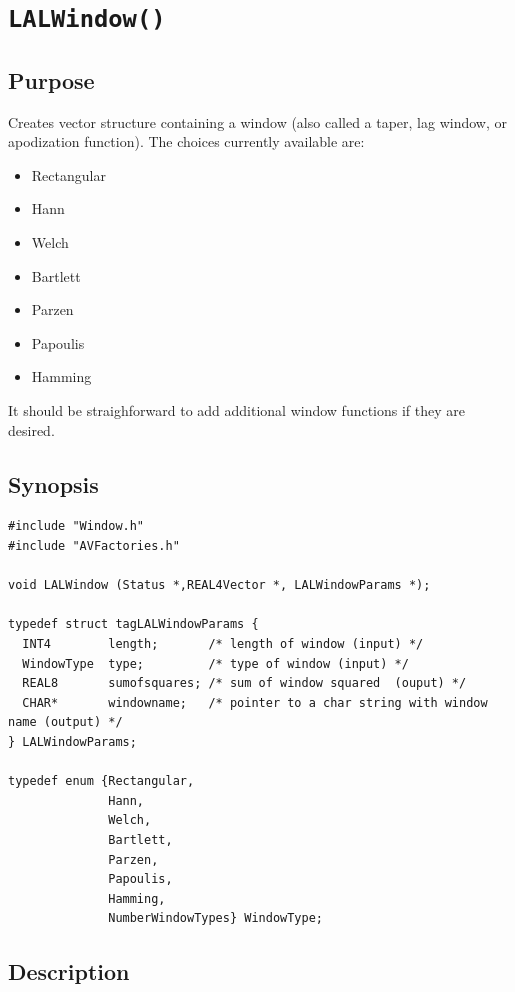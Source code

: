 \documentclass{article}
\begin{document}
\section{{\tt LALWindow()}}

\subsection{Purpose}

Creates vector structure containing a window (also called
a taper, lag window, or apodization function).  The choices
currently available are:
\begin{itemize}
\item Rectangular
\item Hann
\item Welch
\item Bartlett
\item Parzen
\item Papoulis
\item Hamming
\end{itemize}
It should be straighforward to add additional window functions if
they are desired.

\subsection{Synopsis}


\begin{verbatim}
#include "Window.h"
#include "AVFactories.h"

void LALWindow (Status *,REAL4Vector *, LALWindowParams *);

typedef struct tagLALWindowParams {
  INT4        length;       /* length of window (input) */
  WindowType  type;         /* type of window (input) */
  REAL8       sumofsquares; /* sum of window squared  (ouput) */
  CHAR*       windowname;   /* pointer to a char string with window name (output) */
} LALWindowParams;

typedef enum {Rectangular,
              Hann,
              Welch,
              Bartlett,
              Parzen,
              Papoulis,
              Hamming,
              NumberWindowTypes} WindowType;

\end{verbatim}
\subsection{Description}
\end{document}
